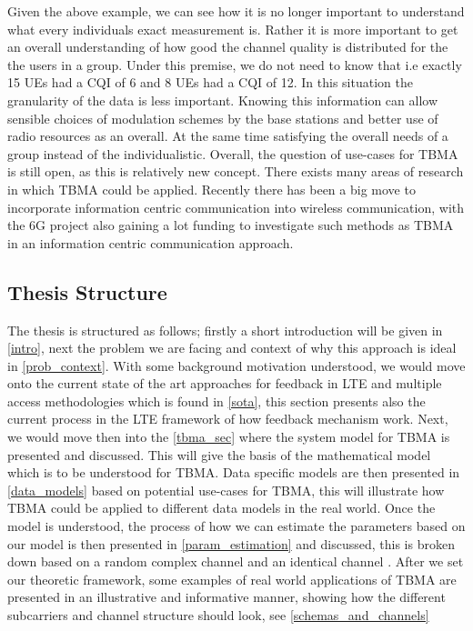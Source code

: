 \documentclass{article}
\begin{document}
Given the above example, we can see how it is no longer important to understand what every individuals exact measurement is. Rather it is more important to get an overall understanding of how good the channel quality is distributed for the the users in a group. Under this premise, we do not need to know that i.e exactly 15 UEs had a CQI of 6 and 8 UEs had a CQI of 12. In this situation the granularity of the data is less important. Knowing this information can allow sensible choices of modulation schemes by the base stations and better use of radio resources as an overall. At the same time satisfying the overall needs of a group instead of the individualistic.  Overall, the question of use-cases for TBMA is still open, as this is relatively new concept. There exists many areas of research in which \ac{TBMA} could be applied. Recently there has been a big move to incorporate information centric communication into wireless communication, with the 6G project also gaining a lot funding to investigate such methods as TBMA in an information centric communication approach. 


\subsection{Thesis Structure }
The thesis is structured as follows; firstly a short introduction will be given in \cref{intro}, next the problem we are facing and context of why this approach is ideal in \cref{prob_context}. With some background motivation understood, we would move onto the current state of the art approaches for feedback in LTE and multiple access methodologies which is found in \cref{sota}, this section presents also the current process in the LTE framework of how feedback mechanism work. Next, we would move then into the \cref{tbma_sec} where the system model for TBMA is presented and discussed. This will give the basis of the mathematical model which is to be understood for TBMA. Data specific models are then presented in \cref{data_models} based on potential use-cases for TBMA, this will illustrate how TBMA could be applied to different data models in the real world. Once the model is understood, the process of how we can estimate the parameters based on our model is then presented in \cref{param_estimation} and discussed, this is broken down based on a random complex channel and an identical channel \cite{tbma}. After we set our theoretic framework, some examples of real world applications of TBMA are presented in an illustrative and informative manner, showing how the different subcarriers and channel structure should look, see \cref{schemas_and_channels}
\end{document}

